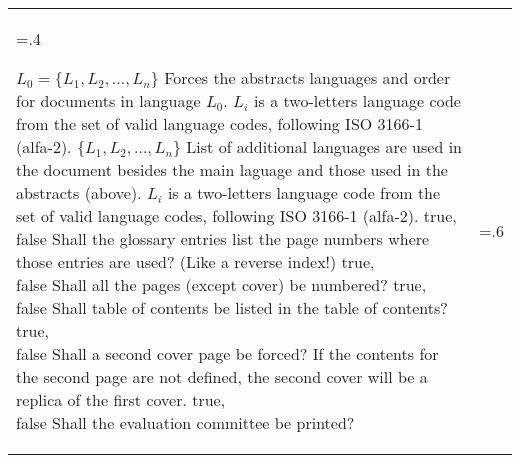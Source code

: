 {\bgroup
\begin{xltabular}{\linewidth}{>{\hsize=.4\hsize\raggedright\arraybackslash}X>{\hsize=.6\hsize}X}
  \toprule
	    {$L_0 = \{L_1, L_2, …, L_n\}$}%
	    {Forces the abstracts languages and order for documents in language $L_0$.}%
		{%
		$L_i$ is a two-letters language code from the set of valid language codes, following ISO 3166-1 (alfa-2).
	    }
	    \midrule
	    {$\{L_1, L_2, …, L_n\}$}%
	    {List of additional languages are used in the document besides the main laguage and those used in the abstracts (above).}%
		{%
		$L_i$ is a two-letters language code from the set of valid language codes, following ISO 3166-1 (alfa-2).
	    }
	    \midrule
  	  	{true, \newline false}%
	    {Shall the glossary entries list the page numbers where those entries are used?  (Like a reverse index!)}%
		{}
	    \midrule
  	  	{true,\newline false }%
	    {Shall all the pages (except cover) be numbered?}%
		{}
	    \midrule
  	  	{true,\newline false }%
	    {Shall table of contents be listed in the table of contents?}%
		{}
	    \midrule
  	  	{true,\newline false }%
	    {Shall a second cover page be forced?}%
		{If the contents for the second page are not defined, the second cover will be a replica of the first cover.}
	    \midrule
  	  	{true,\newline false}%
	    {Shall the evaluation committee be printed?}%
		{%
	    }

\end{xltabular}}
